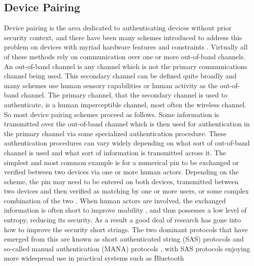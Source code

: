 \documentclass[12pt]{report}
\begin{document}
\subsection{Device Pairing}
Device pairing is the area dedicated to authenticating devices without prior security context, and there have been many schemes introduced to address this problem on devices with myriad hardware features and constraints \cite{PlayfulPairingGallego2011,BedaSoriente2007,ShakeWellBeforeUseMayrhofer2009,SeeingIsBelievingMcCune2005,TalkingToStrangersSmetters2002,LoudAndClearGoodrich2006,HapadepSoriente2008,VisualChannelPairingSaxena2006}. Virtually all of these methods rely on communication over one or more out-of-band channels. An out-of-band channel is any channel which is not the primary communications channel being used. This secondary channel can be defined quite broadly and many schemes use human sensory capabilities or human activity as the out-of-band channel. The primary channel, that the secondary channel is used to authenticate, is a human imperceptible channel, most often the wireless channel. So most device pairing schemes proceed as follows. Some information is transmitted over the out-of-band channel which is then used for authentication in the primary channel via some specialized authentication procedure. These authentication procedures can vary widely depending on what sort of out-of-band channel is used and what sort of information is transmitted across it. The simplest and most common example is for a numerical pin to be exchanged or verified between two devices via one or more human actors. Depending on the scheme, the pin may need to be entered on both devices, transmitted between two devices and then verified as matching by one or more users, or some complex combination of the two \cite{Bluetooth40Spec2010,BluetoothInterfaceFlowSecureSimplePairing2007,JournalCompStudySecurePairingKumar2009}. When human actors are involved, the exchanged information is often short to improve usability \cite{BluetoothInterfaceFlowSecureSimplePairing2007}, and thus possesses a low level of entropy, reducing its security. As a result a good deal of research has gone into how to improve the security short strings. The two dominant protocols that have emerged from this are known as short authenticated string (SAS) protocols \cite{SASVaudenay2005} and so-called manual authentication (MANA) protocols \cite{ManaGehrmann2004}, with SAS protocols enjoying more widespread use in practical systems such as Bluetooth \cite{Bluetooth40Spec2010} \par
\end{document}

